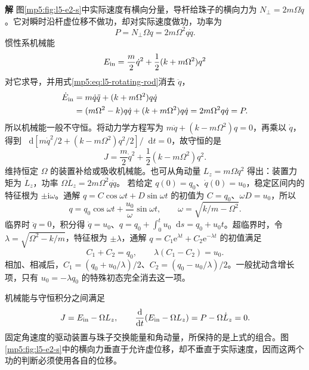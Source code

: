 \documentclass[11pt,openany,fontset=fandol]{ctexbook}
\theoremstyle{definition}\newtheorem{example}{例}[chapter]\newtheorem{exercise}{习题}[chapter]
\newcommand{\SolutionStart}{\par\medskip\ifdim\pagetotal>0pt\ifdim\dimexpr\pagegoal-\pagetotal\relax<3\baselineskip\newpage\fi\fi\noindent\textbf{解}\quad\ignorespaces}
\newenvironment{solution}{\SolutionStart}{\par\medskip}
\newcommand{\dd}{\mathop{}\!\mathrm d}\newcommand{\ee}{\mathrm e}\newcommand{\vct}[1]{\bm{#1}}
\begin{document}
\begin{solution}
图\ref{mp5:fig:l5-e2-s}中实际速度有横向分量，导杆给珠子的横向力为 $N_\perp=2m\Omega\dot q$。它对瞬时沿杆虚位移不做功，却对实际速度做功，功率为
\[
P=N_\perp\Omega q=2m\Omega^2q\dot q.
\]
惯性系机械能
\[
E_{\rm in}=\frac m2\dot q^2+\frac12(k+m\Omega^2)q^2
\]
对它求导，并用式\eqref{mp5:eq:l5-rotating-rod}消去 $\ddot q$，
\[
\begin{aligned}
\dot E_{\rm in}
&=m\dot q\ddot q+(k+m\Omega^2)q\dot q\\
&=(m\Omega^2-k)q\dot q+(k+m\Omega^2)q\dot q
=2m\Omega^2q\dot q=P.
\end{aligned}
\]
所以机械能一般不守恒。将动力学方程写为 $m\ddot q+(k-m\Omega^2)q=0$，再乘以 $\dot q$，得到 $\dd[m\dot q^2/2+(k-m\Omega^2)q^2/2]/\dd t=0$，故守恒的是
\[
\boxed{J=\frac m2\dot q^2+\frac12(k-m\Omega^2)q^2.}
\]
维持恒定 $\Omega$ 的装置补给或吸收机械能。也可从角动量 $L_z=m\Omega q^2$ 得出：装置力矩为 $\dot L_z$，功率 $\Omega\dot L_z=2m\Omega^2q\dot q$。
若给定 $q(0)=q_0$、$\dot q(0)=u_0$，稳定区间内的特征根为 $\pm\mathrm i\omega$。通解 $q=C\cos\omega t+D\sin\omega t$ 的初值为 $C=q_0$、$\omega D=u_0$，所以
\[
q=q_0\cos\omega t+\frac{u_0}{\omega}\sin\omega t,
\qquad \omega=\sqrt{k/m-\Omega^2}.
\]
临界时 $\ddot q=0$，积分得 $\dot q=u_0$、$q=q_0+\int_0^t u_0\dd s=q_0+u_0t$。超临界时，令 $\lambda=\sqrt{\Omega^2-k/m}$，特征根为 $\pm\lambda$，通解 $q=C_1\ee^{\lambda t}+C_2\ee^{-\lambda t}$ 的初值满足
\[
C_1+C_2=q_0,\qquad \lambda(C_1-C_2)=u_0.
\]
相加、相减后，$C_1=(q_0+u_0/\lambda)/2$、$C_2=(q_0-u_0/\lambda)/2$。一般扰动含增长项，只有 $u_0=-\lambda q_0$ 的特殊初态完全消去这一项。

机械能与守恒积分之间满足
\[
J=E_{\rm in}-\Omega L_z,
\qquad \frac{\dd}{\dd t}(E_{\rm in}-\Omega L_z)=P-\Omega\dot L_z=0.
\]
固定角速度的驱动装置与珠子交换能量和角动量，所保持的是上式的组合。图\ref{mp5:fig:l5-e2-s}中的横向力垂直于允许虚位移，却不垂直于实际速度，因而这两个功的判断必须使用各自的位移。

\end{solution}
\end{document}
